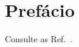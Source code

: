 \chapter*[Prefácio]{Prefácio}

\lipsum
Consulte as Ref.~\cite{gil_2010,oliveira_2011,calcada_2005}.
%
%